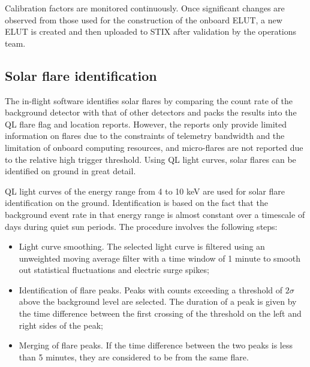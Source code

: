 \documentclass[referee]{aa} %
\begin{document}
Calibration factors are monitored continuously. Once significant changes are 
observed from those used for the construction of  the onboard ELUT, 
 a new ELUT is  created and  then uploaded to STIX after validation by the operations team. 

\subsection{Solar flare identification}
The in-flight software identifies solar flares by comparing  the count rate of 
the background detector with that of other detectors 
 and packs the results into the QL flare flag and location reports.
However,  the reports only provide limited information on flares due to the constraints of telemetry 
bandwidth and the limitation of onboard computing resources, and micro-flares are not 
reported due to the relative high trigger threshold.
Using QL light curves, solar flares can be identified on ground in great detail.

QL light curves of the energy range from  4 to 10 keV are used for solar flare identification
on the ground. Identification is based on the fact 
that the background event rate in that energy range is almost constant 
over a timescale of days during quiet sun periods. 
The procedure involves the following steps:
\begin{itemize}
  \item Light curve smoothing. The selected light curve is filtered using an unweighted
  moving average filter with a time window of 1 minute to smooth out statistical fluctuations and electric surge spikes;
  \item Identification of flare peaks. Peaks with counts exceeding a threshold of $2\sigma$ above the background level
   are selected. The duration of a peak is given by the time difference between the first 
   crossing of the threshold on the left and right sides of the peak;  
  \item Merging of flare peaks. If the time difference between the two peaks is less than 5 minutes,
   they are considered to be from the same flare.
\end{itemize}
\end{document}
